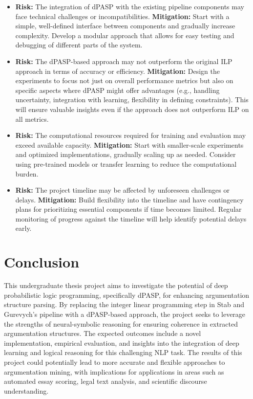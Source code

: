 \documentclass{article}
\begin{document}
\begin{itemize}
    \item \textbf{Risk:} The integration of dPASP with the existing pipeline
    components may face technical challenges or incompatibilities.
    \textbf{Mitigation:} Start with a simple, well-defined interface between
    components and gradually increase complexity. Develop a modular approach
    that allows for easy testing and debugging of different parts of the system.

    \item \textbf{Risk:} The dPASP-based approach may not outperform the
    original ILP approach in terms of accuracy or efficiency.
    \textbf{Mitigation:} Design the experiments to focus not just on overall
    performance metrics but also on specific aspects where dPASP might offer
    advantages (e.g., handling uncertainty, integration with learning,
    flexibility in defining constraints). This will ensure valuable insights
    even if the approach does not outperform ILP on all metrics.

    \item \textbf{Risk:} The computational resources required for training and
    evaluation may exceed available capacity.
    \textbf{Mitigation:} Start with smaller-scale experiments and optimized
    implementations, gradually scaling up as needed. Consider using pre-trained
    models or transfer learning to reduce the computational burden.

    \item \textbf{Risk:} The project timeline may be affected by unforeseen
    challenges or delays.
    \textbf{Mitigation:} Build flexibility into the timeline and have
    contingency plans for prioritizing essential components if time becomes
    limited. Regular monitoring of progress against the timeline will help
    identify potential delays early.
\end{itemize}

\section{Conclusion}

This undergraduate thesis project aims to investigate the potential of deep
probabilistic logic programming, specifically dPASP, for enhancing argumentation
structure parsing. By replacing the integer linear programming step in Stab and
Gurevych's pipeline with a dPASP-based approach, the project seeks to leverage
the strengths of neural-symbolic reasoning for ensuring coherence in extracted
argumentation structures. The expected outcomes include a novel implementation,
empirical evaluation, and insights into the integration of deep learning and
logical reasoning for this challenging NLP task. The results of this project
could potentially lead to more accurate and flexible approaches to argumentation
mining, with implications for applications in areas such as automated essay
scoring, legal text analysis, and scientific discourse understanding.



\end{document}
